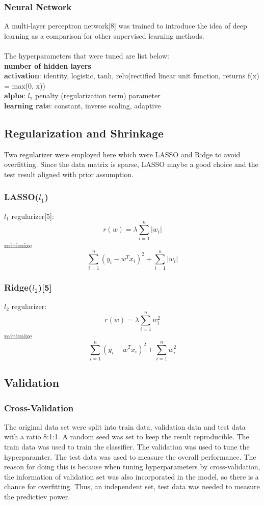 \documentclass{article}
\begin{document}
\subsubsection{Neural Network}
A multi-layer perceptron network[8] was trained to introduce the idea of deep learning as a comparison for other supervised learning methods.\\
\\
The hyperparameters that were tuned are list below:\\
\textbf{number of hidden layers}\\
\textbf{activation}: identity, logistic, tanh, relu(rectified linear unit function, returns f(x) = max(0, x))\\
\textbf{alpha}: $l_2$ penalty (regularization term) parameter\\
\textbf{learning rate}: constant, inverse scaling, adaptive\\

\subsection{Regularization and Shrinkage}
Two regularizer were employed here which were LASSO and Ridge to avoid overfitting. Since the data matrix is sparse, LASSO maybe a good choice and the test result aligned with prior assumption.

\subsubsection{LASSO($l_1$)}
\noindent $l_1$ regularizer[5]:
$$r(w) = \lambda \sum_{i=1}^{n} |w_i|$$
minimize $$  \sum_{i=1}^{n} (y_i - w^Tx_i)^2 + \sum_{i=1}^{n} |w_i|$$

\subsubsection{Ridge($l_2$)[5]}
\noindent $l_2$ regularizer:
$$r(w) = \lambda \sum_{i=1}^{n} w_i^2$$
minimize $$  \sum_{i=1}^{n} (y_i - w^Tx_i)^2 + \sum_{i=1}^{n} w_i^2$$

\subsection{Validation}
\subsubsection{Cross-Validation}
The original data set were split into train data, validation data and test data with a ratio 8:1:1. A random seed was set to keep the result reproducible.
The train data was used to train the classifier. The validation was used to tune the hyperparamter. The test data was used to measure the overall performance. The reason for doing this is because when tuning hyperparameters by cross-validation, the information of validation set was also incorporated in the model, so there is a chance for overfitting. Thus, an independent set, test data was needed to measure the predictiev power.
\end{document}
